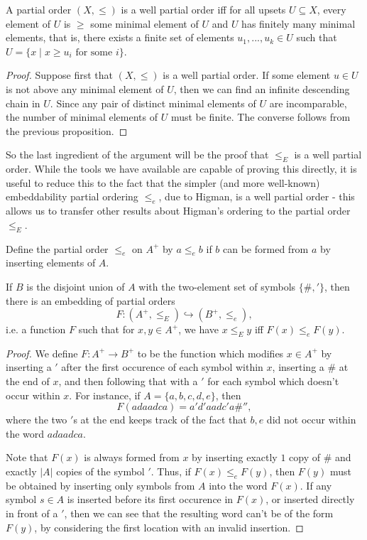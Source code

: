 \begin{prop} A partial order $(X,\le)$ is a well partial order iff for all upsets $U \subseteq X$, every element of $U$ is $\ge$ some minimal element of $U$ and $U$ has finitely many minimal elements, that is, there exists a finite set of elements $u_1, ..., u_k \in U$ such that $U = \{x \mid x \ge u_i\text{ for some }i\}$.
\end{prop}
\begin{proof} Suppose first that $(X,\le)$ is a well partial order. If some element $u \in U$ is not above any minimal element of $U$, then we can find an infinite descending chain in $U$. Since any pair of distinct minimal elements of $U$ are incomparable, the number of minimal elements of $U$ must be finite. The converse follows from the previous proposition.
\end{proof}

So the last ingredient of the argument will be the proof that $\le_E$ is a well partial order. While the tools we have available are capable of proving this directly, it is useful to reduce this to the fact that the simpler (and more well-known) embeddability partial ordering $\le_e$, due to Higman, is a well partial order - this allows us to transfer other results about Higman's ordering to the partial order $\le_E$.

\begin{defn} Define the partial order $\le_e$ on $A^+$ by $a \le_e b$ if $b$ can be formed from $a$ by inserting elements of $A$.
\end{defn}

\begin{prop} If $B$ is the disjoint union of $A$ with the two-element set of symbols $\{\#,'\}$, then there is an embedding of partial orders
\[
F : (A^+, \le_E) \hookrightarrow (B^+, \le_e),
\]
i.e. a function $F$ such that for $x,y \in A^+$, we have $x \le_E y$ iff $F(x) \le_e F(y)$.
\end{prop}
\begin{proof} We define $F : A^+ \rightarrow B^+$ to be the function which modifies $x \in A^+$ by inserting a $'$ after the first occurence of each symbol within $x$, inserting a $\#$ at the end of $x$, and then following that with a $'$ for each symbol which doesn't occur within $x$. For instance, if $A = \{a,b,c,d,e\}$, then
\[
F(adaadca) = a'd'aadc'a\#'',
\]
where the two $'$s at the end keeps track of the fact that $b,e$ did not occur within the word $adaadca$.

Note that $F(x)$ is always formed from $x$ by inserting exactly $1$ copy of $\#$ and exactly $|A|$ copies of the symbol $'$. Thus, if $F(x) \le_e F(y)$, then $F(y)$ must be obtained by inserting only symbols from $A$ into the word $F(x)$. If any symbol $s \in A$ is inserted before its first occurence in $F(x)$, or inserted directly in front of a $'$, then we can see that the resulting word can't be of the form $F(y)$, by considering the first location with an invalid insertion.
\end{proof}

